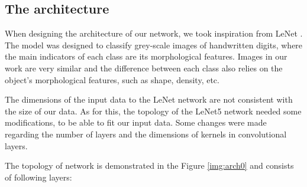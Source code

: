 \subsection{The architecture}

When designing the architecture of our network, we took inspiration from LeNet \cite{lenet5}. The model was designed to classify grey-scale images of handwritten digits, where the main indicators of each class are its morphological features. Images in our work are very similar and the difference between each class also relies on the object's morphological features, such as shape, density, etc. 

The dimensions of the input data to the LeNet network are not consistent with the size of our data. As for this, the topology of the LeNet5 network needed some modifications, to be able to fit our input data. Some changes were made regarding the number of layers and the dimensions of kernels in convolutional layers. 

The topology of network is demonstrated in the Figure \ref{img:arch0} and consists of following layers: 


